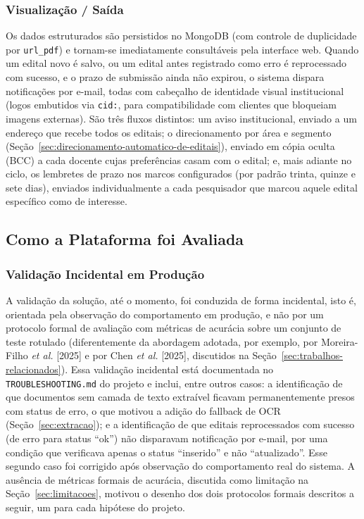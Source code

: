 \documentclass[12pt]{article}
\begin{document}
  \subsubsection{Visualização / Saída}\label{sec:visualizacao-saida}
  Os dados estruturados são persistidos no MongoDB (com controle de duplicidade por \texttt{url\_pdf}) e tornam-se imediatamente consultáveis pela interface web. Quando um edital novo é salvo, ou um edital antes registrado como erro é reprocessado com sucesso, e o prazo de submissão ainda não expirou, o sistema dispara notificações por e-mail, todas com cabeçalho de identidade visual institucional (logos embutidos via \texttt{cid:}, para compatibilidade com clientes que bloqueiam imagens externas). São três fluxos distintos: um aviso institucional, enviado a um endereço que recebe todos os editais; o direcionamento por área e segmento (Seção~\ref{sec:direcionamento-automatico-de-editais}), enviado em cópia oculta (BCC) a cada docente cujas preferências casam com o edital; e, mais adiante no ciclo, os lembretes de prazo nos marcos configurados (por padrão trinta, quinze e sete dias), enviados individualmente a cada pesquisador que marcou aquele edital específico como de interesse.

  \subsection{Como a Plataforma foi Avaliada}\label{sec:como-a-plataforma-foi-avaliada}

  \subsubsection{Validação Incidental em Produção}\label{sec:validacao-incidental-em-producao}
  A validação da solução, até o momento, foi conduzida de forma incidental, isto é, orientada pela observação do comportamento em produção, e não por um protocolo formal de avaliação com métricas de acurácia sobre um conjunto de teste rotulado (diferentemente da abordagem adotada, por exemplo, por Moreira-Filho \emph{et al.} [2025] e por Chen \emph{et al.} [2025], discutidos na Seção~\ref{sec:trabalhos-relacionados}). Essa validação incidental está documentada no \texttt{TROUBLESHOOTING.md} do projeto e inclui, entre outros casos: a identificação de que documentos sem camada de texto extraível ficavam permanentemente presos com status de erro, o que motivou a adição do fallback de OCR (Seção~\ref{sec:extracao}); e a identificação de que editais reprocessados com sucesso (de erro para status ``ok'') não disparavam notificação por e-mail, por uma condição que verificava apenas o status ``inserido'' e não ``atualizado''. Esse segundo caso foi corrigido após observação do comportamento real do sistema. A ausência de métricas formais de acurácia, discutida como limitação na Seção~\ref{sec:limitacoes}, motivou o desenho dos dois protocolos formais descritos a seguir, um para cada hipótese do projeto.
\end{document}
